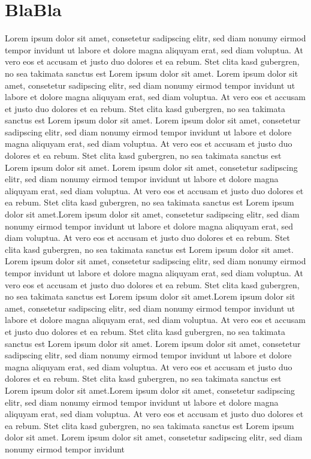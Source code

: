 \section{BlaBla}
Lorem ipsum dolor sit amet, consetetur sadipscing elitr, sed diam nonumy eirmod tempor invidunt ut labore et dolore magna aliquyam erat, sed diam voluptua. At vero eos et accusam et justo duo dolores et ea rebum. Stet clita kasd gubergren, no sea takimata sanctus est Lorem ipsum dolor sit amet. Lorem ipsum dolor sit amet, consetetur sadipscing elitr, sed diam nonumy eirmod tempor invidunt ut labore et dolore magna aliquyam erat, sed diam voluptua. At vero eos et accusam et justo duo dolores et ea rebum. Stet clita kasd gubergren, no sea takimata sanctus est Lorem ipsum dolor sit amet.\cite{thorwarth_technical_2021}
Lorem ipsum dolor sit amet, consetetur sadipscing elitr, sed diam nonumy eirmod tempor invidunt ut labore et dolore magna aliquyam erat, sed diam voluptua. At vero eos et accusam et justo duo dolores et ea rebum. Stet clita kasd gubergren, no sea takimata sanctus est Lorem ipsum dolor sit amet. Lorem ipsum dolor sit amet,\cite{davis_glioblastoma_2016, neph_deepmc_2021} consetetur sadipscing elitr, sed diam nonumy eirmod tempor invidunt ut labore et dolore magna aliquyam erat, sed diam voluptua. At vero eos et accusam et justo duo dolores et ea rebum. Stet clita kasd gubergren, no sea takimata sanctus est Lorem ipsum dolor sit amet.Lorem ipsum dolor sit amet, consetetur sadipscing elitr, sed diam nonumy eirmod tempor invidunt ut labore et dolore magna aliquyam erat, sed diam voluptua. At vero eos et accusam et justo duo dolores et ea rebum. Stet clita kasd gubergren, no sea takimata sanctus est Lorem ipsum dolor sit amet. Lorem ipsum dolor sit amet, consetetur sadipscing elitr, sed diam nonumy eirmod tempor invidunt ut labore et dolore magna aliquyam erat, sed diam voluptua. At vero eos et accusam et justo duo dolores et ea rebum. Stet clita kasd gubergren, no sea takimata sanctus est Lorem ipsum dolor sit amet.Lorem ipsum dolor sit amet, consetetur sadipscing elitr, sed diam nonumy eirmod tempor invidunt ut labore et dolore magna aliquyam erat, sed diam voluptua. At vero eos et accusam et justo duo dolores et ea rebum. Stet clita kasd gubergren, no sea takimata sanctus est Lorem ipsum dolor sit amet. Lorem ipsum dolor sit amet, consetetur sadipscing elitr, sed diam nonumy eirmod tempor invidunt ut labore et dolore magna aliquyam erat, sed diam voluptua. At vero eos et accusam et justo duo dolores et ea rebum. Stet clita kasd gubergren, no sea takimata sanctus est Lorem ipsum dolor sit amet.Lorem ipsum dolor sit amet, consetetur sadipscing elitr, sed diam nonumy eirmod tempor invidunt ut labore et dolore magna aliquyam erat, sed diam voluptua. At vero eos et accusam et justo duo dolores et ea rebum. Stet clita kasd gubergren, no sea takimata sanctus est Lorem ipsum dolor sit amet. Lorem ipsum dolor sit amet, consetetur sadipscing elitr, sed diam nonumy eirmod tempor invidunt 


